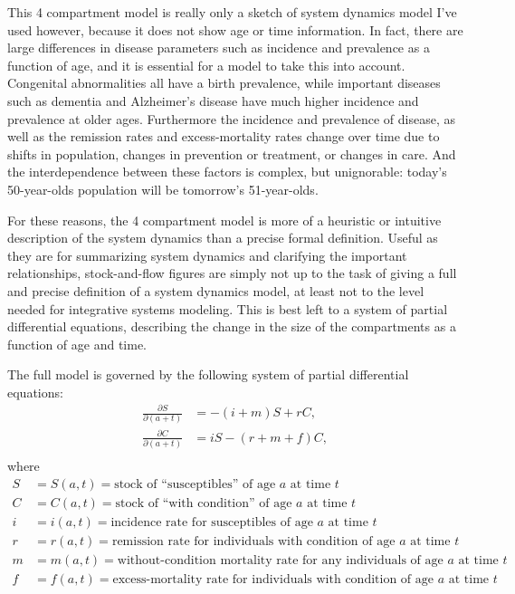 This 4 compartment model is really only a sketch of system dynamics
model I've used however, because it does not show age or time
information. In fact, there are large differences in disease
parameters such as incidence and prevalence as a function of age, and
it is essential for a model to take this into account.  Congenital
abnormalities all have a birth prevalence, while important diseases
such as dementia and Alzheimer's disease have much higher incidence
and prevalence at older ages. Furthermore the incidence and prevalence
of disease, as well as the remission rates and excess-mortality rates
change over time due to shifts in population, changes in prevention or
treatment, or changes in care. And the interdependence between these
factors is complex, but unignorable: today's 50-year-olds population
will be tomorrow's 51-year-olds.

For these reasons, the 4 compartment model is more of a heuristic or
intuitive description of the system dynamics than a precise formal
definition.  Useful as they are for summarizing system dynamics and
clarifying the important relationships, stock-and-flow figures are
simply not up to the task of giving a full and precise
definition of a system dynamics model, at least not to the level
needed for integrative systems modeling.  This is best left to a system
of partial differential equations, describing the change in the size
of the compartments as a function of age and time.

The full model is governed by the following system of partial
differential equations:
\begin{align*}
\frac{\partial S}{\partial (a+t)} &= -(i + m)S + rC,\\
\frac{\partial C}{\partial (a+t)} &= iS - (r + m + f)C,\\
\end{align*}
where
\begin{align*}
S &= S(a,t) = \text{stock of ``susceptibles'' of age $a$ at time $t$}\\
C &= C(a,t) = \text{stock of ``with condition'' of age $a$ at
  time $t$}\\[.1in]
i &= i(a,t) = \text{incidence rate for susceptibles of age $a$ at time $t$}\\
r &= r(a,t) = \text{remission rate for individuals with condition of age $a$ at time $t$}\\
m &= m(a,t) = \text{without-condition mortality rate for any individuals of age $a$ at
time $t$}\\
f &= f(a,t) = \text{excess-mortality rate for individuals with
condition of age $a$ at time
  $t$}
\end{align*}

